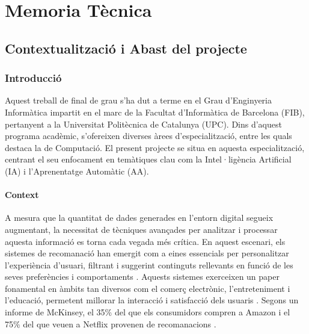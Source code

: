 \documentclass[a4paper,12pt]{report}
\begin{document}

\clearpage

\tableofcontents

\listoffigures

\listoftables

\part{Memoria Tècnica}

\chapter{Contextualització i Abast del projecte}

\section{Introducció}

Aquest treball de final de grau s'ha dut a terme en el Grau d'Enginyeria Informàtica impartit en el marc de la Facultat d'Informàtica de Barcelona (FIB), pertanyent a la Universitat Politècnica de Catalunya (UPC). Dins d'aquest programa acadèmic, s'ofereixen diverses àrees d'especialització, entre les quals destaca la de Computació. El present projecte se situa en aquesta especialització, centrant el seu enfocament en temàtiques clau com la Intel·ligència Artificial (IA) i l'Aprenentatge Automàtic (AA).

\subsection{Context}

A mesura que la quantitat de dades generades en l'entorn digital segueix augmentant, la necessitat de tècniques avançades per analitzar i processar aquesta informació es torna cada vegada més crítica.
En aquest escenari, els sistemes de recomanació han emergit com a eines essencials per personalitzar l'experiència d'usuari, filtrant i suggerint continguts rellevants en funció de les seves preferències i comportaments \cite{Idrees_2024}.
Aquests sistemes exerceixen un paper fonamental en àmbits tan diversos com el comerç electrònic, l'entreteniment i l'educació, permetent millorar la interacció i satisfacció dels usuaris \cite{Kantor_Ricci_Rokach_Shapira_2011}.
Segons un informe de McKinsey, el 35\% del que els consumidors compren a Amazon i el 75\% del que veuen a Netflix provenen de recomanacions \cite{MacKenzie_Meyer_Noble_2013}.
\end{document}
